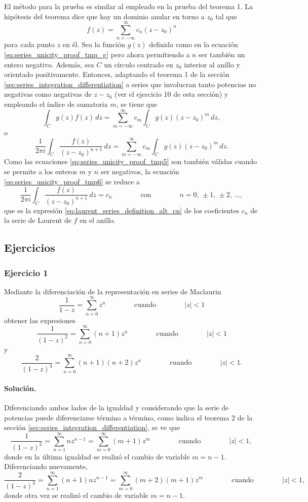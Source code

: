 \documentclass[a4paper]{report}
\begin{document}
El método para la prueba es similar al empleado en la prueba del teorema 1. La hipótesis del teorema dice que hay un dominio anular en torno a \(z_0\) tal que  
\[
 f(z)=\sum_{n=-\infty}^\infty c_n(z-z_0)^n 
\]
para cada punto \(z\) en él. Sea la función \(g(z)\) definida como en la ecuación \ref{eq:series_unicity_proof_tmp_g} pero ahora permitiendo a \(n\) ser también un entero negativo. Además, sea \(C\) un círculo centrado en \(z_0\) interior al anillo y orientado positivamente. Entonces, adaptando el teorema 1 de la sección \ref{sec:series_integration_differentiation} a series que involucran tanto potencias no negativas como negativas de \(z-z_0\) (ver el ejercicio 10 de esta sección) y empleando el índice de sumatoria \(m\), se tiene que 
\[
 \int_C g(z)f(z)\,dz=\sum_{m=-\infty}^\infty c_m\int_C g(z)(z-z_0)^m\,dz, 
\]
o
\begin{equation}\label{eq:series_unicity_proof_tmp6}
 \frac{1}{2\pi i}\int_C \frac{f(z)}{(z-z_0)^{n+1}}\,dz=\sum_{m=-\infty}^\infty c_m\int_C g(z)(z-z_0)^m\,dz. 
\end{equation}
Como las ecuaciones \ref{eq:series_unicity_proof_tmp5} son también válidas cuando se permite a los enteros \(m\) y \(n\) ser negativos, la ecuación \ref{eq:series_unicity_proof_tmp6} se reduce a 
\[
 \frac{1}{2\pi i}\int_C \frac{f(z)}{(z-z_0)^{n+1}}\,dz=c_n
 \qquad\qquad\textrm{con}\qquad\qquad
 n=0,\,\pm1,\,\pm2,\,\dots,
\]
que es la expresión \ref{eq:laurent_series_definition_alt_cn} de los coeficientes \(c_n\) de la serie de Laurent de \(f\) en el anillo.

\subsection*{Ejercicios}

\subsubsection*{Ejercicio 1}

Mediante la diferenciación de la representación en series de Maclaurin
\[
 \frac{1}{1-z}=\sum_{n=0}^\infty z^n
 \qquad\qquad\textrm{cuando}\qquad\qquad
 |z|<1
\]
obtener las expresiones
\[
 \frac{1}{(1-z)^2}=\sum_{n=0}^\infty(n+1)z^n
 \qquad\qquad\textrm{cuando}\qquad\qquad
 |z|<1
\]
y
\[
 \frac{2}{(1-z)^3}=\sum_{n=0}^\infty(n+1)(n+2)z^n
 \qquad\qquad\textrm{cuando}\qquad\qquad
 |z|<1.
\]

\paragraph{Solución.} Diferenciando ambos lados de la igualdad y considerando que la serie de potencias puede diferenciarse término a término, como indica el teorema 2 de la sección \ref{sec:series_integration_differentiation}, se ve que 
\[
 \frac{1}{(1-z)^2}=\sum_{n=1}^\infty nz^{n-1}=\sum_{m=0}^\infty(m+1)z^m
 \qquad\qquad\textrm{cuando}\qquad\qquad
 |z|<1,
\]
donde en la última igualdad se realizó el cambio de variable \(m=n-1\). Diferenciando nuevamente,
\[
 \frac{2}{(1-z)^3}=\sum_{n=1}^\infty(n+1)nz^{n-1}=\sum_{m=0}^\infty(m+2)(m+1)z^m
 \qquad\qquad\textrm{cuando}\qquad\qquad
 |z|<1,
\]
donde otra vez se realizó el cambio de variable \(m=n-1\).
\end{document}
